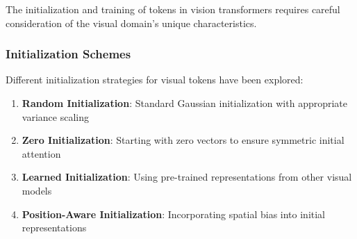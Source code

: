 The initialization and training of \cls{} tokens in vision transformers requires careful consideration of the visual domain's unique characteristics.

\subsubsection{Initialization Schemes}

Different initialization strategies for visual \cls{} tokens have been explored:

\begin{enumerate}
\item \textbf{Random Initialization}: Standard Gaussian initialization with appropriate variance scaling
\item \textbf{Zero Initialization}: Starting with zero vectors to ensure symmetric initial attention
\item \textbf{Learned Initialization}: Using pre-trained representations from other visual models
\item \textbf{Position-Aware Initialization}: Incorporating spatial bias into initial representations
\end{enumerate}

